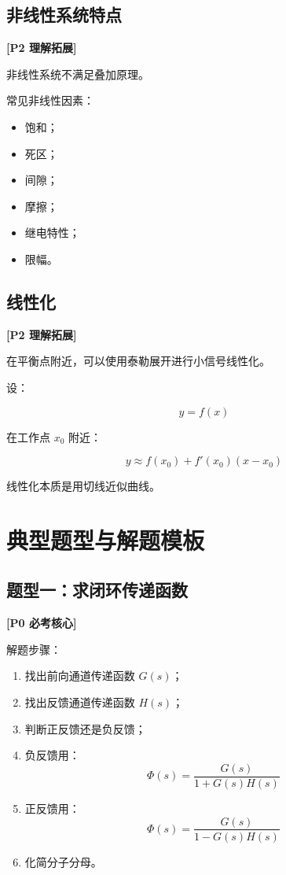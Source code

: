 \documentclass[UTF8,a4paper,12pt]{ctexart}
\newcommand{\Pzero}{\textcolor{p0}{\textbf{[P0 必考核心]}}}
\newcommand{\Ptwo}{\textcolor{p2}{\textbf{[P2 理解拓展]}}}
\begin{document}
\subsection{非线性系统特点}

\Ptwo

非线性系统不满足叠加原理。

常见非线性因素：

\begin{itemize}
    \item 饱和；
    \item 死区；
    \item 间隙；
    \item 摩擦；
    \item 继电特性；
    \item 限幅。
\end{itemize}

\subsection{线性化}

\Ptwo

在平衡点附近，可以使用泰勒展开进行小信号线性化。

设：

\[
y=f(x)
\]

在工作点 $x_0$ 附近：

\[
y\approx f(x_0)+f'(x_0)(x-x_0)
\]

线性化本质是用切线近似曲线。

\section{典型题型与解题模板}

\subsection{题型一：求闭环传递函数}

\Pzero

解题步骤：

\begin{enumerate}
    \item 找出前向通道传递函数 $G(s)$；
    \item 找出反馈通道传递函数 $H(s)$；
    \item 判断正反馈还是负反馈；
    \item 负反馈用：
    \[
    \Phi(s)=\frac{G(s)}{1+G(s)H(s)}
    \]
    \item 正反馈用：
    \[
    \Phi(s)=\frac{G(s)}{1-G(s)H(s)}
    \]
    \item 化简分子分母。
\end{enumerate}
\end{document}
